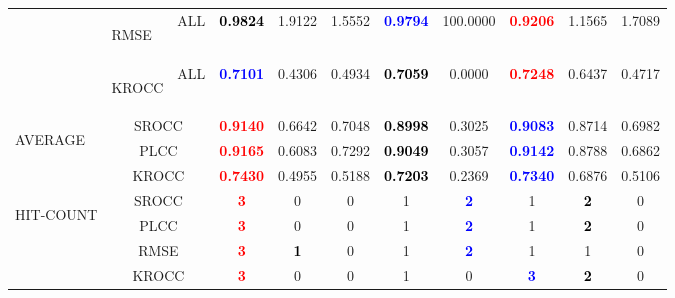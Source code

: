 \documentclass{article}
\begin{document}
\begin{table}
\begin{tabular}{||l|l|l||cccccccc||}
\cmidrule{2-11}\cmidrule{2-11}
&\multirow{1}{*}{\begin{turn}{-90}RMSE\end{turn}}&ALL&\textbf{\textcolor{black}{0.9824}}&1.9122&1.5552&\textbf{\textcolor{blue}{0.9794}}&100.0000&\textbf{\textcolor{red}{0.9206}}&1.1565&1.7089\\
\cmidrule{2-11}\cmidrule{2-11}
&\multirow{1}{*}{\begin{turn}{-90}KROCC\end{turn}}&ALL&\textbf{\textcolor{blue}{0.7101}}&0.4306&0.4934&\textbf{\textcolor{black}{0.7059}}&0.0000&\textbf{\textcolor{red}{0.7248}}&0.6437&0.4717\\
\midrule\midrule
\multirow{3}{*}{\begin{turn}{-90}AVERAGE\end{turn}}&\multicolumn{2}{c||}{SROCC}&\textbf{\textcolor{red}{0.9140}}&0.6642&0.7048&\textbf{\textcolor{black}{0.8998}}&0.3025&\textbf{\textcolor{blue}{0.9083}}&0.8714&0.6982
\\ \cmidrule{2-11}
&\multicolumn{2}{c||}{PLCC}&\textbf{\textcolor{red}{0.9165}}&0.6083&0.7292&\textbf{\textcolor{black}{0.9049}}&0.3057&\textbf{\textcolor{blue}{0.9142}}&0.8788&0.6862
\\ \cmidrule{2-11}
&\multicolumn{2}{c||}{KROCC}&\textbf{\textcolor{red}{0.7430}}&0.4955&0.5188&\textbf{\textcolor{black}{0.7203}}&0.2369&\textbf{\textcolor{blue}{0.7340}}&0.6876&0.5106
\\ \midrule \midrule
\multirow{4}{*}{\begin{turn}{-90}HIT-COUNT\end{turn}}&\multicolumn{2}{c||}{SROCC}&\textbf{\textcolor{red}{3}}&0&0&1&\textbf{\textcolor{blue}{2}}&1&\textbf{\textcolor{black}{2}}&0
\\ \cmidrule{2-11}
&\multicolumn{2}{c||}{PLCC}&\textbf{\textcolor{red}{3}}&0&0&1&\textbf{\textcolor{blue}{2}}&1&\textbf{\textcolor{black}{2}}&0
\\ \cmidrule{2-11}
&\multicolumn{2}{c||}{RMSE}&\textbf{\textcolor{red}{3}}&\textbf{\textcolor{black}{1}}&0&1&\textbf{\textcolor{blue}{2}}&1&1&0
\\ \cmidrule{2-11}
&\multicolumn{2}{c||}{KROCC}&\textbf{\textcolor{red}{3}}&0&0&1&0&\textbf{\textcolor{blue}{3}}&\textbf{\textcolor{black}{2}}&0
\\ \midrule \midrule
\end{tabular}
\end{table}
\end{document}
